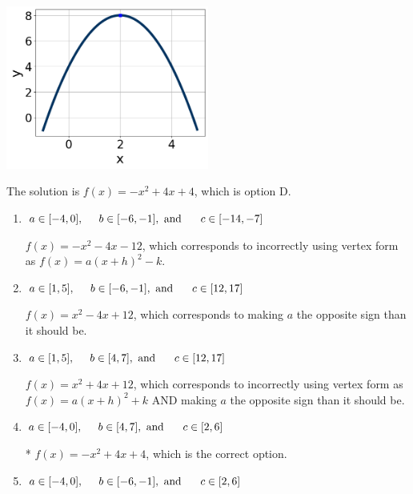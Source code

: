 \documentclass{extbook}[14pt]
\begin{document}
\begin{enumerate}
{\begin{center}
    \includegraphics[width=0.5\textwidth]{../Figures/quadraticGraphToEquationCopyC.png}
\end{center}


The solution is \( f(x) = -x^{2} +4 x + 4 \), which is option D.\begin{enumerate}[label=\Alph*.]
\item \( a \in [-4, 0], \hspace*{5mm} b \in [-6, -1], \text{ and } \hspace*{5mm} c \in [-14, -7] \)

$f(x)=-x^{2} -4 x -12$, which corresponds to incorrectly using vertex form as $f(x) = a(x+h)^2 - k$.
\item \( a \in [1, 5], \hspace*{5mm} b \in [-6, -1], \text{ and } \hspace*{5mm} c \in [12, 17] \)

$f(x)=x^{2} -4 x + 12$, which corresponds to making $a$ the opposite sign than it should be.
\item \( a \in [1, 5], \hspace*{5mm} b \in [4, 7], \text{ and } \hspace*{5mm} c \in [12, 17] \)

$f(x)=x^{2} +4 x + 12$, which corresponds to incorrectly using vertex form as $f(x) = a(x+h)^2+k$ AND making $a$ the opposite sign than it should be.
\item \( a \in [-4, 0], \hspace*{5mm} b \in [4, 7], \text{ and } \hspace*{5mm} c \in [2, 6] \)

* $f(x)=-x^{2} +4 x + 4$, which is the correct option.
\item \( a \in [-4, 0], \hspace*{5mm} b \in [-6, -1], \text{ and } \hspace*{5mm} c \in [2, 6] \)


\end{enumerate}}
\end{enumerate}
\end{document}
